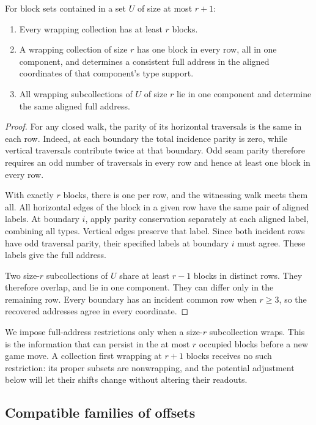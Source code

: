 \begin{lemma}\label{comp:wrapping}
For block sets contained in a set $U$ of size at most $r+1$:
\begin{enumerate}
\item Every wrapping collection has at least $r$ blocks.
\item A wrapping collection of size $r$ has one block in every row,
  all in one component, and determines a consistent full address in
  the aligned coordinates of that component's type support.
\item All wrapping subcollections of $U$ of size $r$ lie in one
  component and determine the same aligned full address.
\end{enumerate}
\end{lemma}
\begin{proof}
For any closed walk, the parity of its horizontal traversals is the same
in each row.  Indeed, at each boundary the total incidence parity is
zero, while vertical traversals contribute twice at that boundary.
Odd seam parity therefore requires an odd number of traversals in every
row and hence at least one block in every row.

With exactly $r$ blocks, there is one per row, and the witnessing walk
meets them all.  All horizontal edges of the block in a given row have
the same pair of aligned labels.  At boundary $i$, apply parity
conservation separately at each aligned label, combining all types.
Vertical edges preserve that label.  Since both incident rows have odd
traversal parity, their specified labels at boundary $i$ must agree.
These labels give the full address.

Two size-$r$ subcollections of $U$ share at least $r-1$ blocks in distinct
rows.  They therefore overlap, and lie in one component.  They can differ
only in the remaining row.  Every boundary has an incident common row
when $r\geq3$, so the recovered addresses agree in every coordinate.
\end{proof}

We impose full-address restrictions only when a size-$r$ subcollection
wraps.  This is the information that can persist in the at most $r$
occupied blocks before a new game move.  A collection first wrapping at
$r+1$ blocks receives no such restriction: its proper subsets are
nonwrapping, and the potential adjustment below will let their shifts
change without altering their readouts.

\subsection{Compatible families of offsets}

